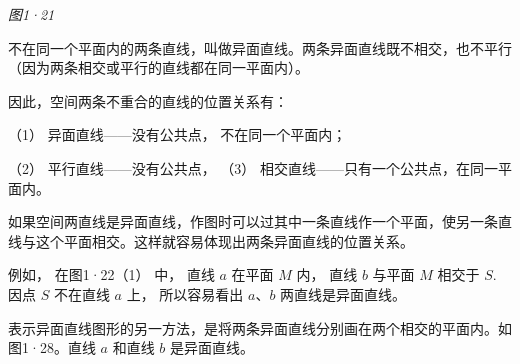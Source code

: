 \emph{图1·21}

不在同一个平面内的两条直线，叫做异面直线。两条异面直线既不相交，也不平行（因为两条相交或平行的直线都在同一平面内）。

因此，空间两条不重合的直线的位置关系有：

（1） 异面直线------没有公共点， 不在同一个平面内；

（2） 平行直线------没有公共点， （3）
相交直线------只有一个公共点，在同一平面内。

如果空间两直线是异面直线，作图时可以过其中一条直线作一个平面，使另一条直线与这个平面相交。这样就容易体现出两条异面直线的位置关系。

例如， 在图1·22（1） 中， 直线 \(a\) 在平面 \(M\) 内， 直线 \(b\) 与平面
\(M\) 相交于 \(S\). 因点 \(S\) 不在直线 \(a\) 上， 所以容易看出
\(a\)、\(b\) 两直线是异面直线。

表示异面直线图形的另一方法，是将两条异面直线分别画在两个相交的平面内。如图1·28。直线
\(a\) 和直线 \(b\) 是异面直线。

